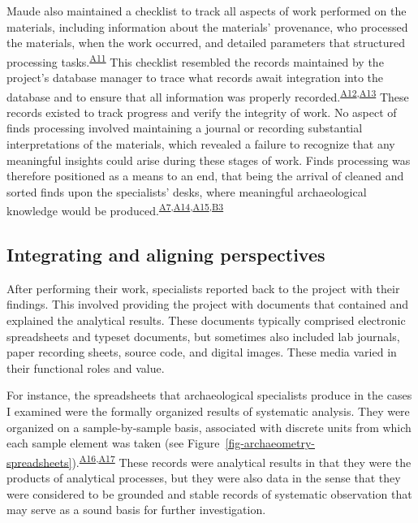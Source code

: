 \documentclass[
  canadian,
]{article}
\begin{document}
Maude also maintained a checklist to track all aspects of work performed
on the materials, including information about the materials' provenance,
who processed the materials, when the work occurred, and detailed
parameters that structured processing
tasks.\textsuperscript{\hyperref[sec-A11]{A11}} This checklist resembled
the records maintained by the project's database manager to trace what
records await integration into the database and to ensure that all
information was properly
recorded.\textsuperscript{\hyperref[sec-A12]{A12},\hyperref[sec-A13]{A13}}
These records existed to track progress and verify the integrity of
work. No aspect of finds processing involved maintaining a journal or
recording substantial interpretations of the materials, which revealed a
failure to recognize that any meaningful insights could arise during
these stages of work. Finds processing was therefore positioned as a
means to an end, that being the arrival of cleaned and sorted finds upon
the specialists' desks, where meaningful archaeological knowledge would
be
produced.\textsuperscript{\hyperref[sec-A7]{A7},\hyperref[sec-A14]{A14},\hyperref[sec-A15]{A15},\hyperref[sec-B3]{B3}}

\subsection{Integrating and aligning
perspectives}\label{integrating-and-aligning-perspectives}

After performing their work, specialists reported back to the project
with their findings. This involved providing the project with documents
that contained and explained the analytical results. These documents
typically comprised electronic spreadsheets and typeset documents, but
sometimes also included lab journals, paper recording sheets, source
code, and digital images. These media varied in their functional roles
and value.

For instance, the spreadsheets that archaeological specialists produce
in the cases I examined were the formally organized results of
systematic analysis. They were organized on a sample-by-sample basis,
associated with discrete units from which each sample element was taken
(see
Figure~\ref{fig-archaeometry-spreadsheets}).\textsuperscript{\hyperref[sec-A16]{A16},\hyperref[sec-A17]{A17}}
These records were analytical results in that they were the products of
analytical processes, but they were also data in the sense that they
were considered to be grounded and stable records of systematic
observation that may serve as a sound basis for further investigation.
\end{document}
